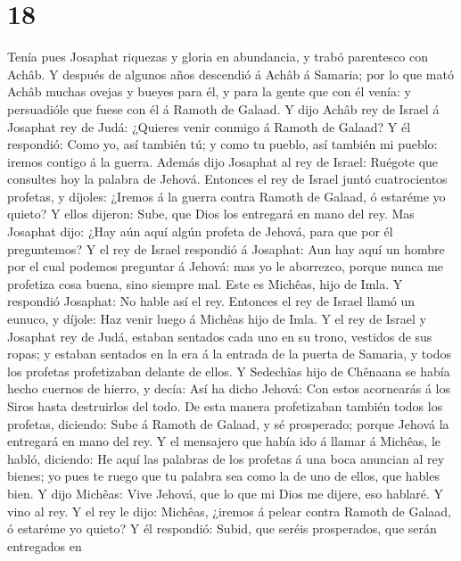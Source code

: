 \hypertarget{section-17}{%
\section{18}\label{section-17}}

 Tenía pues Josaphat riquezas y gloria en abundancia, y
trabó parentesco con Achâb.  Y después de algunos años
descendió á Achâb á Samaria; por lo que mató Achâb muchas ovejas y
bueyes para él, y para la gente que con él venía: y persuadióle que
fuese con él á Ramoth de Galaad.  Y dijo Achâb rey de Israel
á Josaphat rey de Judá: ¿Quieres venir conmigo á Ramoth de Galaad? Y él
respondió: Como yo, así también tú; y como tu pueblo, así también mi
pueblo: iremos contigo á la guerra.  Además dijo Josaphat al
rey de Israel: Ruégote que consultes hoy la palabra de Jehová.
 Entonces el rey de Israel juntó cuatrocientos profetas, y
díjoles: ¿Iremos á la guerra contra Ramoth de Galaad, ó estaréme yo
quieto? Y ellos dijeron: Sube, que Dios los entregará en mano del rey.
 Mas Josaphat dijo: ¿Hay aún aquí algún profeta de Jehová,
para que por él preguntemos?  Y el rey de Israel respondió á
Josaphat: Aun hay aquí un hombre por el cual podemos preguntar á Jehová:
mas yo le aborrezco, porque nunca me profetiza cosa buena, sino siempre
mal. Este es Michêas, hijo de Imla. Y respondió Josaphat: No hable así
el rey.  Entonces el rey de Israel llamó un eunuco, y
díjole: Haz venir luego á Michêas hijo de Imla.  Y el rey de
Israel y Josaphat rey de Judá, estaban sentados cada uno en su trono,
vestidos de sus ropas; y estaban sentados en la era á la entrada de la
puerta de Samaria, y todos los profetas profetizaban delante de ellos.
 Y Sedechîas hijo de Chênaana se había hecho cuernos de
hierro, y decía: Así ha dicho Jehová: Con estos acornearás á los Siros
hasta destruirlos del todo.  De esta manera profetizaban
también todos los profetas, diciendo: Sube á Ramoth de Galaad, y sé
prosperado; porque Jehová la entregará en mano del rey.  Y
el mensajero que había ido á llamar á Michêas, le habló, diciendo: He
aquí las palabras de los profetas á una boca anuncian al rey bienes; yo
pues te ruego que tu palabra sea como la de uno de ellos, que hables
bien.  Y dijo Michêas: Vive Jehová, que lo que mi Dios me
dijere, eso hablaré. Y vino al rey.  Y el rey le dijo:
Michêas, ¿iremos á pelear contra Ramoth de Galaad, ó estaréme yo quieto?
Y él respondió: Subid, que seréis prosperados, que serán entregados en
